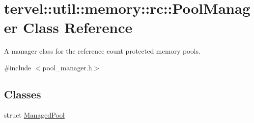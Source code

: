\hypertarget{classtervel_1_1util_1_1memory_1_1rc_1_1_pool_manager}{}\section{tervel\+:\+:util\+:\+:memory\+:\+:rc\+:\+:Pool\+Manager Class Reference}
\label{classtervel_1_1util_1_1memory_1_1rc_1_1_pool_manager}


A manager class for the reference count protected memory pools.  




{\ttfamily \#include $<$pool\+\_\+manager.\+h$>$}

\subsection*{Classes}
\begin{DoxyCompactItemize}
\item 
struct \hyperlink{structtervel_1_1util_1_1memory_1_1rc_1_1_pool_manager_1_1_managed_pool}{Managed\+Pool}
\end{DoxyCompactItemize}
